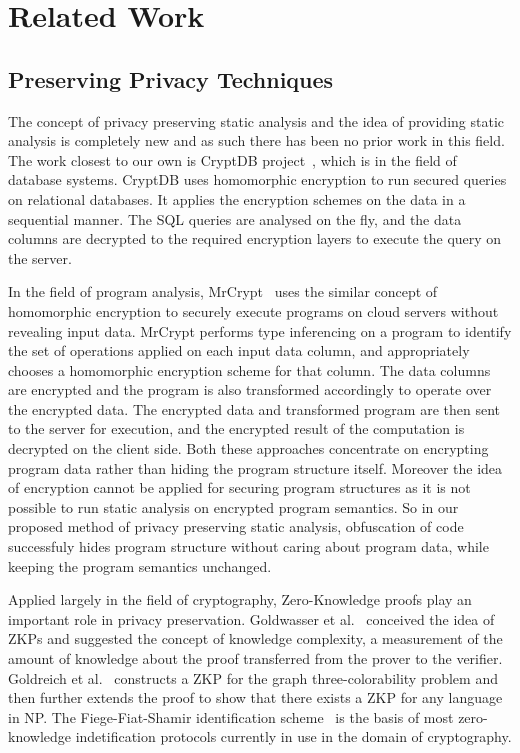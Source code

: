 \documentclass[conference]{IEEEtran}
\begin{document}
\section{Related Work}
\subsection{Preserving Privacy Techniques}
The concept of privacy preserving static analysis and the idea of providing static analysis is completely new and as such there has been no prior work in this field. The work closest 
to our own is CryptDB project~\cite{cryptdb}, which is in the field of database systems. CryptDB uses homomorphic encryption to run secured queries on relational databases. It applies 
the encryption schemes on the data in a sequential manner. The SQL queries are analysed on the fly, and the data columns 
are decrypted to the required encryption layers to execute the query on the server. 

In the field of program analysis, MrCrypt~\cite{mrcrypt} uses the similar concept of homomorphic 
encryption to securely execute programs on cloud servers without revealing input data. MrCrypt performs type inferencing on a program to identify the set of operations applied on each input data 
column, and appropriately chooses a homomorphic encryption scheme for that column. The data columns are encrypted and the program is also transformed accordingly to operate over 
the encrypted data. The encrypted data and transformed program are then sent to the server for execution, and the encrypted result of the computation is decrypted on the client side. 
Both these approaches concentrate on encrypting program data rather than hiding the program structure itself. Moreover the idea of encryption cannot be applied for securing 
program structures as it is not possible to run static analysis on encrypted program semantics. So in our proposed method of privacy preserving static analysis, obfuscation of code 
successfuly hides program structure without caring about program data, while keeping the program semantics unchanged.

Applied largely in the field of cryptography, Zero-Knowledge proofs play an important role in privacy preservation. Goldwasser et al.~\cite{Goldwasser} conceived the idea of ZKPs 
and suggested the concept of knowledge complexity, a measurement of the amount of knowledge about the proof transferred from the prover to the verifier. Goldreich et al.~\cite{Goldreich} 
constructs a ZKP for the graph three-colorability problem and then further extends the proof to show that there exists a ZKP for any language in NP. The Fiege-Fiat-Shamir identification 
scheme~\cite{Fiege} is the basis of most zero-knowledge indetification protocols currently in use in the domain of cryptography. 
\end{document}
